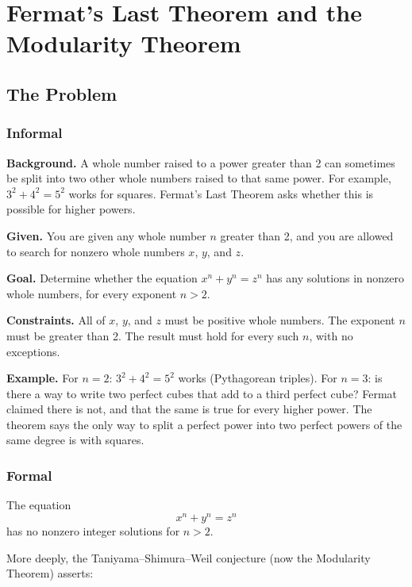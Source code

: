\let\LocalMacro\relax

\chapter{Fermat's Last Theorem and the Modularity Theorem}

\section{The Problem}

\subsection{Informal}

\textbf{Background.} A whole number raised to a power greater than 2 can sometimes be split into two other whole numbers raised to that same power. For example, $3^2 + 4^2 = 5^2$ works for squares. Fermat's Last Theorem asks whether this is possible for higher powers.

\textbf{Given.} You are given any whole number $n$ greater than 2, and you are allowed to search for nonzero whole numbers $x$, $y$, and $z$.

\textbf{Goal.} Determine whether the equation $x^n + y^n = z^n$ has any solutions in nonzero whole numbers, for every exponent $n > 2$.

\textbf{Constraints.} All of $x$, $y$, and $z$ must be positive whole numbers. The exponent $n$ must be greater than 2. The result must hold for every such $n$, with no exceptions.

\textbf{Example.} For $n = 2$: $3^2 + 4^2 = 5^2$ works (Pythagorean triples). For $n = 3$: is there a way to write two perfect cubes that add to a third perfect cube? Fermat claimed there is not, and that the same is true for every higher power. The theorem says the only way to split a perfect power into two perfect powers of the same degree is with squares.

\subsection{Formal}
The equation
\begin{equation}
x^n + y^n = z^n
\end{equation}
has no nonzero integer solutions for $n > 2$.

More deeply, the Taniyama--Shimura--Weil conjecture (now the Modularity Theorem) asserts:

